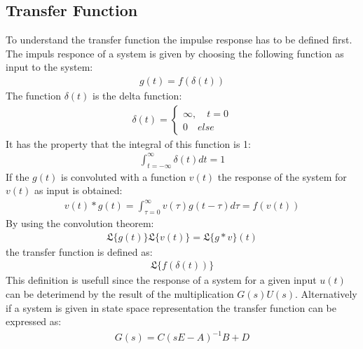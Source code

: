 \subsection{Transfer Function}
To understand the transfer function the impulse response has to be defined first.
The impuls responce of a system is given by choosing the following function as input to the system:
\begin{gather}
g(t) = f(\delta(t))
\end{gather}
The function \(\delta(t)\) is the delta function:
\begin{gather}
\delta(t) = \begin{cases}
\infty, \quad t = 0 \\
0 \quad else
\end{cases}
\end{gather}
It has the property that the integral of this function is 1:
\begin{gather}
\int_{t = -\infty}^{\infty} \delta(t) dt = 1
\end{gather}
If the \(g(t)\) is convoluted with a function \(v(t)\) the response of the system for \(v(t)\) as input is obtained:
\begin{gather}
v(t)*g(t) = \int_{\tau = 0}^{\infty} v(\tau)g(t-\tau)d\tau = f(v(t))
\end{gather}
\cite{DouglasBb}
By using the convolution theorem:
\begin{gather}
\mathfrak{L}\{g(t)\}\mathfrak{L}\{v(t)\} = \mathfrak{L}\{g*v\}(t)
\end{gather}
\cite{ABELL2018399}
the transfer function is defined as:
\begin{gather}
\mathfrak{L}\{f(\delta(t))\}
\end{gather}
This definition is usefull since the response of a system for a given input \(u(t)\) can be deterimend by the result of the multiplication \(G(s)U(s)\).
\cite{DouglasBb}
Alternatively if a system is given in state space representation the transfer function can be expressed as:
\begin{gather}
G(s) = C(sE-A)^{-1}B+D \label{tf-from-ss}
\end{gather}
\cite{BennerGrivet}

